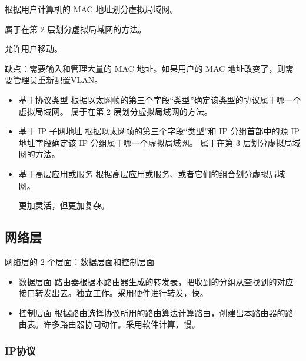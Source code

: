 \documentclass[11pt]{article}
\begin{document}
\begin{enumerate}
\begin{enumerate}
\begin{enumerate}
\begin{enumerate}
\begin{itemize}
根据用户计算机的 MAC 地址划分虚拟局域网。

属于在第 2 层划分虚拟局域网的方法。

允许用户移动。
\end{itemize}

缺点：需要输入和管理大量的 MAC 地址。如果用户的 MAC 地址改变了，则需要管理员重新配置VLAN。

\begin{itemize}
\item 基于协议类型
根据以太网帧的第三个字段“类型”确定该类型的协议属于哪一个虚拟局域网。
属于在第 2 层划分虚拟局域网的方法。

\item 基于 IP 子网地址
根据以太网帧的第三个字段“类型”和 IP 分组首部中的源 IP 地址字段确定该 IP 分组属于哪一个虚拟局域网。
属于在第 3 层划分虚拟局域网的方法。

\item 基于高层应用或服务
根据高层应用或服务、或者它们的组合划分虚拟局域网。

更加灵活，但更加复杂。
\end{itemize}
\end{enumerate}
\end{enumerate}
\end{enumerate}
\end{enumerate}
\subsection{网络层}
\label{sec:org373fd0e}

网络层的 2 个层面：数据层面和控制层面


\begin{itemize}
\item 数据层面
路由器根据本路由器生成的转发表，把收到的分组从查找到的对应接口转发出去。独立工作。采用硬件进行转发，快。
\item 控制层面
根据路由选择协议所用的路由算法计算路由，创建出本路由器的路由表。许多路由器协同动作。采用软件计算，慢。
\end{itemize}
\subsubsection{IP协议}
\label{sec:org11881a9}
\end{document}
